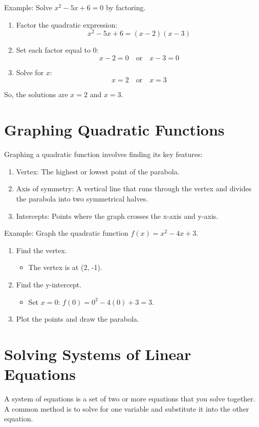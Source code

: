 Example: Solve \( x^2 - 5x + 6 = 0 \) by factoring.
\begin{enumerate}
    \item Factor the quadratic expression:
    \[ x^2 - 5x + 6 = (x - 2)(x - 3) \]
    \item Set each factor equal to 0:
    \[ x - 2 = 0 \quad \text{or} \quad x - 3 = 0 \]
    \item Solve for \( x \):
    \[ x = 2 \quad \text{or} \quad x = 3 \]
\end{enumerate}
So, the solutions are \( x = 2 \) and \( x = 3 \).

\section{Graphing Quadratic Functions}
Graphing a quadratic function involves finding its key features:
\begin{enumerate}
    \item Vertex: The highest or lowest point of the parabola.
    \item Axis of symmetry: A vertical line that runs through the vertex and divides the parabola into two symmetrical halves.
    \item Intercepts: Points where the graph crosses the x-axis and y-axis.
\end{enumerate}

Example: Graph the quadratic function \( f(x) = x^2 - 4x + 3 \).
\begin{enumerate}
    \item Find the vertex.
    \begin{itemize}
        \item The vertex is at (2, -1).
    \end{itemize}
    \item Find the y-intercept.
    \begin{itemize}
        \item Set \( x = 0 \): \( f(0) = 0^2 - 4(0) + 3 = 3 \).
    \end{itemize}
    \item Plot the points and draw the parabola.
\end{enumerate}

\section{Solving Systems of Linear Equations}
A system of equations is a set of two or more equations that you solve together. A common method is to solve for one variable and substitute it into the other equation.


